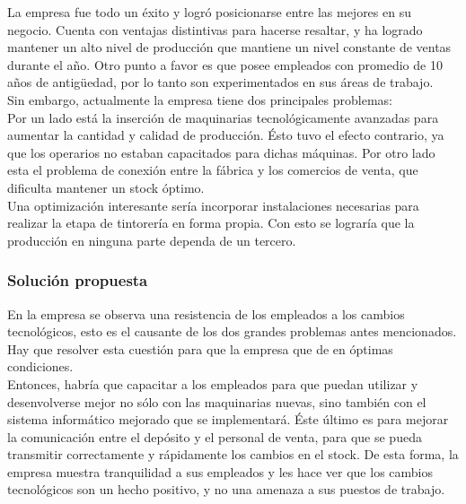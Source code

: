 \documentclass[a4paper,10pt,titlepage]{article}
\begin{document}
	La empresa fue todo un \'exito y logr\'o posicionarse entre las mejores en su negocio. Cuenta con ventajas distintivas para hacerse resaltar, y ha logrado mantener un alto nivel de producci\'on que mantiene un nivel constante de ventas durante el a\~no. Otro punto a favor es que posee empleados con promedio de 10 a\~nos de antig\"uedad, por lo tanto son experimentados en sus \'areas de trabajo.\\
		
	Sin embargo, actualmente la empresa tiene dos principales problemas:\\
	
	Por un lado est\'a la inserci\'on de maquinarias tecnol\'ogicamente avanzadas para aumentar la cantidad y calidad de producci\'on. \'Esto tuvo el efecto contrario, ya que los operarios no estaban capacitados para dichas m\'aquinas. Por otro lado esta el problema de conexi\'on entre la f\'abrica y los comercios de venta, que dificulta mantener un stock \'optimo.\\
	
	Una optimizaci\'on interesante ser\'ia incorporar instalaciones necesarias para realizar la etapa de tintorer\'ia en forma propia. Con esto se lograr\'ia que la producci\'on en ninguna parte dependa de un tercero.


\subsubsection{Soluci\'on propuesta}
	En la empresa se observa una resistencia de los empleados a los cambios tecnol\'ogicos, esto es el causante de los dos grandes problemas antes mencionados. Hay que resolver esta cuesti\'on para que la empresa que de en \'optimas condiciones.\\

	Entonces, habr\'ia que capacitar a los empleados para que puedan utilizar y desenvolverse mejor no s\'olo con las maquinarias nuevas, sino tambi\'en con el sistema inform\'atico mejorado que se implementar\'a. \'Este \'ultimo es para mejorar la comunicaci\'on entre el dep\'osito y el personal de venta, para que se pueda transmitir correctamente y r\'apidamente los cambios en el stock. De esta forma, la empresa muestra tranquilidad a sus empleados y les hace ver que los cambios tecnol\'ogicos son un hecho positivo, y no una amenaza a sus puestos de trabajo. 
\end{document}
